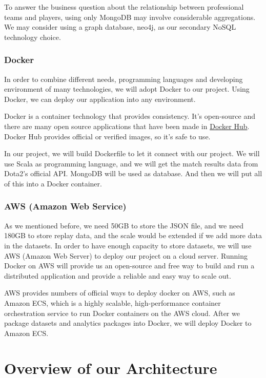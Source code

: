 \documentclass{article}
\begin{document}
To answer the business question about the relationship between professional teams and players, using only MongoDB may involve considerable aggregations. We may consider using a graph database, neo4j, as our secondary NoSQL technology choice.

\subsubsection{Docker}

In order to combine different needs, programming languages and developing environment of many technologies, we will adopt Docker to our project.
Using Docker, we can deploy our application into any environment.

Docker is a container technology that provides consistency.
It's open-source and there are many open source applications that have been made in \href{https://hub.docker.com}{Docker Hub}.
Docker Hub provides official or verified images, so it's safe to use.

In our project, we will build Dockerfile to let it connect with our project.
We will use Scala as programming language, and we will get the match results data from Dota2's official API.
MongoDB will be used as database. And then we will put all of this into a Docker container.

\subsubsection{AWS (Amazon Web Service)}

As we mentioned before, we need 50GB to store the JSON file, and we need 180GB to store replay data, and the scale would be extended if we add more data in the datasets.
In order to have enough capacity to store datasets, we will use AWS (Amazon Web Server) to deploy our project on a cloud server.
Running Docker on AWS will provide us an open-source and free way to build and run a distributed application and provide a reliable and easy way to scale out.

AWS provides numbers of official ways to deploy docker on AWS, such as Amazon ECS, which is a highly scalable, high-performance container orchestration service to run Docker containers on the AWS cloud.
After we package datasets and analytics packages into Docker, we will deploy Docker to Amazon ECS.


\section{Overview of our Architecture}
\end{document}
